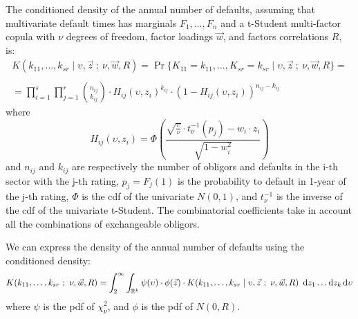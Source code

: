 \documentclass[11pt,fleqn]{book} %
\begin{document}
\begin{proposition}
	\label{prop:cdand}
	The conditioned density of the annual number of defaults, assuming 
	that multivariate default times has marginals $F_1,\dots,F_n$ and a 
	t-Student multi-factor copula with $\nu$ degrees of freedom, factor 
	loadings $\vec{w}$, and factors correlations $R$, is:
	\begin{displaymath}
		\begin{array}{l}
			K(k_{11},\dots,k_{sr} \mid \upsilon,\vec{z}\ ;\ \nu,\vec{w}, R) = 
			\Pr\{K_{11}=k_{11},\dots,K_{sr}=k_{sr} \mid \upsilon,\vec{z}\ ;\ \nu, \vec{w}, R\} = \\
			\\
			= \displaystyle \prod_{i=1}^s \prod_{j=1}^r \binom{n_{ij}}{k_{ij}} \cdot
			H_{ij}(\upsilon,z_i)^{k_{ij}} \cdot
			\left( 1 - H_{ij}(\upsilon,z_i) \right)^{n_{ij}-k_{ij}}
		\end{array}
	\end{displaymath}
	where
	\begin{displaymath}
		H_{ij}(\upsilon,z_i) = \Phi\left(  
		\frac{\sqrt{\frac{\upsilon}{\nu}} \cdot t_{\nu}^{-1}(p_j) - w_i\cdot z_i}{\sqrt{1-w_i^2}}
		\right)
	\end{displaymath}
	and $n_{ij}$ and $k_{ij}$ are respectively the number of obligors and 
	defaults in the i-th sector with the j-th rating, $p_j = F_j(1)$ 
	is the probability to default in 1-year of the j-th rating,
	$\Phi$ is the cdf of the univariate $N(0,1)$, and $t_{\nu}^{-1}$ is the 
	inverse of the cdf of the univariate t-Student. The combinatorial coefficients 
	take in account all the combinations of exchangeable obligors.
\end{proposition}

\begin{corollary}
	We can express the density of the annual number of defaults using 
	the conditioned density:
	\begin{displaymath}
			K(k_{11},\dots,k_{sr}\ ;\ \nu, \vec{w}, R) = %
			\displaystyle \int_2^{\infty} \int_{\mathbb{R}^k}
			\psi(\upsilon) \cdot \phi(\vec{z}) \cdot
			K(k_{11},\dots,k_{sr} \mid \upsilon,\vec{z}\ ;\ \nu,\vec{w}, R) 
			\ \ud z_1 \dots \ud z_k \ud \upsilon
	\end{displaymath}
	where $\psi$ is the pdf of $\chi_{\nu}^2$, and $\phi$ is the pdf of $N(0,R)$.
\end{corollary}
\end{document}
